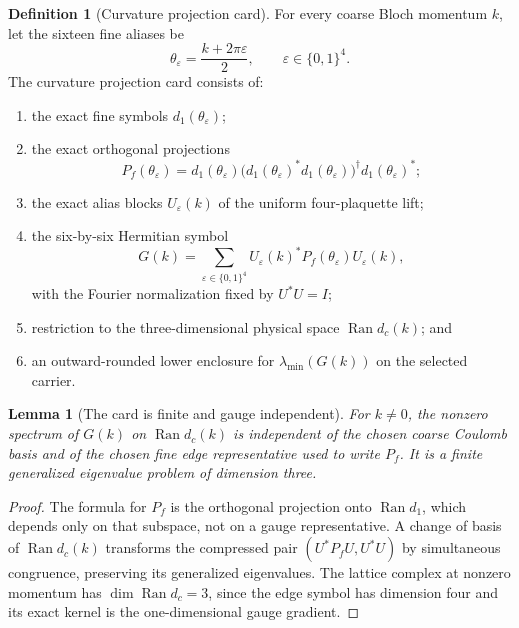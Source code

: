 \documentclass[11pt,oneside]{book}
\newtheorem{lemma}[theorem]{Lemma}
\theoremstyle{definition}
\newtheorem{definition}[theorem]{Definition}
\theoremstyle{remark}
\begin{document}
\begin{definition}[Curvature projection card]
\label{def:e8v16-cpc}
For every coarse Bloch momentum \(k\), let the sixteen fine aliases be
\[
                  \theta_\varepsilon=\frac{k+2\pi\varepsilon}{2},
      \qquad\varepsilon\in\{0,1\}^4.                               \tag{16.26}
\]
The curvature projection card consists of:
\begin{enumerate}
\item the exact fine symbols \(d_1(\theta_\varepsilon)\);
\item the exact orthogonal projections
\[
 P_f(\theta_\varepsilon)
 =d_1(\theta_\varepsilon)
  \bigl(d_1(\theta_\varepsilon)^*d_1(\theta_\varepsilon)\bigr)^\dagger
  d_1(\theta_\varepsilon)^*;
\]
\item the exact alias blocks \(U_\varepsilon(k)\) of the uniform
four-plaquette lift;
\item the six-by-six Hermitian symbol
\[
 G(k)=\sum_{\varepsilon\in\{0,1\}^4}
       U_\varepsilon(k)^*P_f(\theta_\varepsilon)U_\varepsilon(k),
                                                                    \tag{16.27}
\]
with the Fourier normalization fixed by \(U^*U=I\);
\item restriction to the three-dimensional physical space
\(\operatorname{Ran}d_c(k)\); and
\item an outward-rounded lower enclosure for
\(\lambda_{\min}(G(k))\) on the selected carrier.
\end{enumerate}
\end{definition}

\begin{lemma}[The card is finite and gauge independent]
\label{lem:e8v16-card}
For \(k\ne0\), the nonzero spectrum of \(G(k)\) on
\(\operatorname{Ran}d_c(k)\) is independent of the chosen coarse
Coulomb basis and of the chosen fine edge representative used to
write \(P_f\).  It is a finite generalized eigenvalue problem of
dimension three.
\end{lemma}

\begin{proof}
The formula for \(P_f\) is the orthogonal projection onto
\(\operatorname{Ran}d_1\), which depends only on that subspace, not on
a gauge representative.  A change of basis of
\(\operatorname{Ran}d_c(k)\) transforms the compressed pair
\((U^*P_fU,U^*U)\) by simultaneous congruence, preserving its
generalized eigenvalues.  The lattice complex at nonzero momentum has
\(\dim\operatorname{Ran}d_c=3\), since the edge symbol has dimension
four and its exact kernel is the one-dimensional gauge gradient.
\end{proof}
\end{document}

